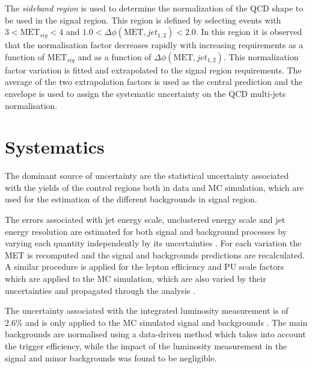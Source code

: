 The \textit{sideband region} is used to determine the normalization of the \gls{QCD} shape to be used in the signal region. This region is defined by selecting events with $3<\text{MET}_{sig}<4$ and $1.0<\Delta\phi(\text{MET},jet_{1,2})<2.0$. In this region it is observed that the normalisation factor decreases rapidly with increasing requirements as a function of $\text{MET}_{sig}$ and as a function of $\Delta\phi(\text{MET},jet_{1,2})$. This normalization factor variation is fitted and extrapolated to the signal region requirements. The average of the two extrapolation factors is used as the central prediction and the envelope is used to assign the systematic uncertainty on the \gls{QCD} multi-jets normalisation.

\section{Systematics}


The dominant source of uncertainty are the statistical uncertainty associated with the yields of the control regions both in data and \gls{MC} simulation, which are used for the estimation of the different backgrounds in signal region. 

The errors associated with jet energy scale, unclustered energy scale and jet energy resolution are estimated for both signal and background processes by varying each quantity independently by its uncertainties \cite{ARTICLE:CMSDeterminationJetEnergyCalibration}. For each variation the \gls{MET} is recomputed and the signal and backgrounds predictions are recalculated. A similar procedure is applied for the lepton efficiency and \gls{PU} scale factors which are applied to the \gls{MC} simulation, which are also varied by their uncertainties and propagated through the analysis \cite{ARTICLE:CMSMuonReconstruction7TeV,ARTICLE:CMSElectronReconstruction8TeV}.

The uncertainty associated with the integrated luminosity measurement is of 2.6\% and is only applied to the \gls{MC} simulated signal and backgrounds \cite{ARTICLE:CMSLuminosityBasedonPixelClusterCounting}. The main backgrounds are normalised using a data-driven method which takes into account the trigger efficiency, while the impact of the luminosity measurement in the signal and minor backgrounds was found to be negligible.


